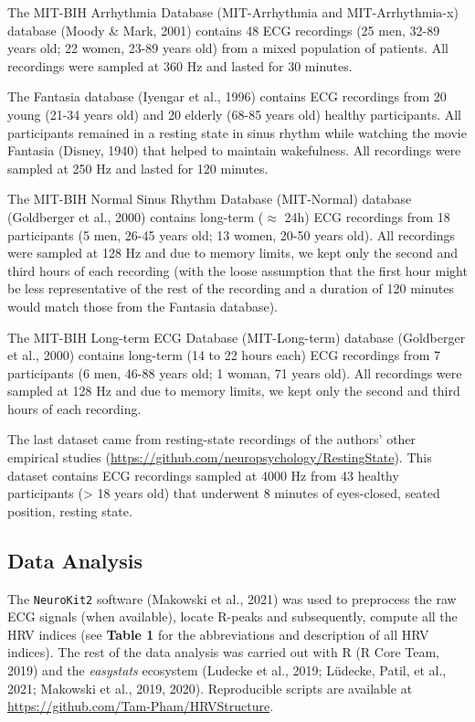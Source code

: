 \documentclass[
  english,
  jou,floatsintext]{apa6}
\begin{document}
The MIT-BIH Arrhythmia Database (MIT-Arrhythmia and MIT-Arrhythmia-x) database (Moody \& Mark, 2001) contains 48 ECG recordings (25 men, 32-89 years old; 22 women, 23-89 years old) from a mixed population of patients. All recordings were sampled at 360 Hz and lasted for 30 minutes.

The Fantasia database (Iyengar et al., 1996) contains ECG recordings from 20 young (21-34 years old) and 20 elderly (68-85 years old) healthy participants. All participants remained in a resting state in sinus rhythm while watching the movie Fantasia (Disney, 1940) that helped to maintain wakefulness. All recordings were sampled at 250 Hz and lasted for 120 minutes.

The MIT-BIH Normal Sinus Rhythm Database (MIT-Normal) database (Goldberger et al., 2000) contains long-term (\(\approx\) 24h) ECG recordings from 18 participants (5 men, 26-45 years old; 13 women, 20-50 years old). All recordings were sampled at 128 Hz and due to memory limits, we kept only the second and third hours of each recording (with the loose assumption that the first hour might be less representative of the rest of the recording and a duration of 120 minutes would match those from the Fantasia database).

The MIT-BIH Long-term ECG Database (MIT-Long-term) database (Goldberger et al., 2000) contains long-term (14 to 22 hours each) ECG recordings from 7 participants (6 men, 46-88 years old; 1 woman, 71 years old). All recordings were sampled at 128 Hz and due to memory limits, we kept only the second and third hours of each recording.

The last dataset came from resting-state recordings of the authors' other empirical studies (\url{https://github.com/neuropsychology/RestingState}). This dataset contains ECG recordings sampled at 4000 Hz from 43 healthy participants (\textgreater{} 18 years old) that underwent 8 minutes of eyes-closed, seated position, resting state.

\hypertarget{data-analysis}{%
\subsection{Data Analysis}\label{data-analysis}}

The \texttt{NeuroKit2} software (Makowski et al., 2021) was used to preprocess the raw ECG signals (when available), locate R-peaks and subsequently, compute all the HRV indices (see \textbf{Table 1} for the abbreviations and description of all HRV indices). The rest of the data analysis was carried out with R (R Core Team, 2019) and the \emph{easystats} ecosystem (Ludecke et al., 2019; Lüdecke, Patil, et al., 2021; Makowski et al., 2019, 2020). Reproducible scripts are available at \url{https://github.com/Tam-Pham/HRVStructure}.
\end{document}
